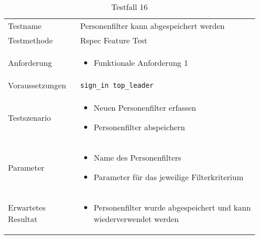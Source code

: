 \begin{table}[h!]
   \begin{tabular}{|L{0.4\textwidth}|L{0.6\textwidth}|}
       \hline
         \\[12pt]
       \hline
        Testname & Personenfilter kann abgespeichert werden \\
       \hline
       Testmethode & Rspec Feature Test \\
       \hline
        Anforderung & 
        \begin{itemize}
         \item Funktionale Anforderung 1
         \end{itemize}  \\
       \hline
       Voraussetzungen & \texttt{sign\_in top\_leader} \\
       \hline
       Testszenario & 
       \begin{itemize}
         \item Neuen Personenfilter erfassen
         \item Personenfilter abspeichern
       \end{itemize} \\
       \hline
       Parameter & \begin{itemize}
         \item Name des Personenfilters
         \item Parameter für das jeweilige Filterkriterium
       \end{itemize} \\
       \hline
       Erwartetes Resultat & 
       \begin{itemize}
         \item Personenfilter wurde abgespeichert und kann wiederverwendet werden
       \end{itemize} \\
     \hline
     \end{tabular}
     \caption{Testfall 16}
\end{table}

\newpage

